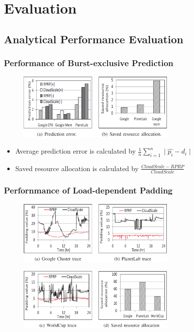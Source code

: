 \documentclass{beamer}
\begin{document}
\section{Evaluation}

\subsection{Analytical Performance Evaluation}
	\begin{frame}
	\frametitle{Performance of Burst-exclusive Prediction}
		\begin{figure}[h!]
		\centering
		\includegraphics[width=0.7\textwidth]{./figure/eva1_1.PNG}
		\end{figure}
		\begin{itemize}
		\item Average prediction error is calculated by $\frac{1}{n}\sum_{i=1}^{n}\mid \hat{p_{i}}-d_{i} \mid$
		\item Saved resource allocation is calculated by $\frac{CloudScale-RPRP}{CloudScale}$
		\end{itemize}
	\end{frame}

	\begin{frame}
	\frametitle{Perfornmance of Load-dependent Padding}
		\begin{figure}[h!]
		\centering
		\includegraphics[width=0.7\textwidth]{./figure/eva1_2.PNG}
		\end{figure}
		\begin{figure}[h!]
		\centering
		\includegraphics[width=0.7\textwidth]{./figure/eva1_3.PNG}
		\end{figure}
	\end{frame}
\end{document}
